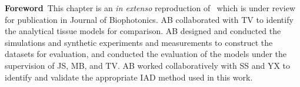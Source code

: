\begin{center}
\begin{minipage}[b]{0.9\linewidth}
\small
\textbf{Foreword\,}
This chapter is an \emph{in extenso} reproduction of~\citet{Bahl2023a} which is under review for publication in Journal of Biophotonics. 
\newline
AB collaborated with TV to identify the analytical tissue models for comparison. AB 
designed and conducted the simulations and synthetic experiments and measurements to construct the datasets for evaluation, and conducted the evaluation of the models under the supervision of JS, MB, and TV. AB worked collaboratively with SS and YX to identify and validate the appropriate IAD method used in this work. 
\end{minipage}
\end{center}

\minitoc


